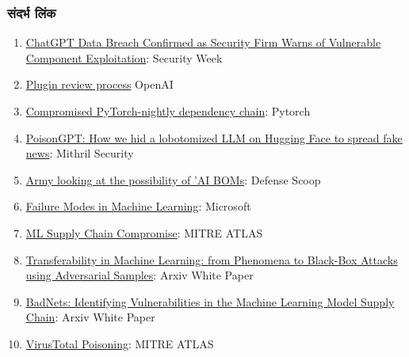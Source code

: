 \documentclass[
]{article}
\providecommand{\tightlist}{%
  \setlength{\itemsep}{0pt}\setlength{\parskip}{0pt}}
\begin{document}
\subsubsection{संदर्भ लिंक}\label{ux938ux926ux930ux92d-ux932ux915}

\begin{enumerate}
\def\labelenumi{\arabic{enumi}.}
\tightlist
\item
  \href{https://www.securityweek.com/chatgpt-data-breach-confirmed-as-security-firm-warns-of-vulnerable-component-exploitation/}{ChatGPT
  Data Breach Confirmed as Security Firm Warns of Vulnerable Component
  Exploitation}: Security Week
\item
  \href{https://platform.openai.com/docs/plugins/review}{Plugin review
  process} OpenAI
\item
  \href{https://pytorch.org/blog/compromised-nightly-dependency/}{Compromised
  PyTorch-nightly dependency chain}: Pytorch
\item
  \href{https://blog.mithrilsecurity.io/poisongpt-how-we-hid-a-lobotomized-llm-on-hugging-face-to-spread-fake-news/}{PoisonGPT:
  How we hid a lobotomized LLM on Hugging Face to spread fake news}:
  Mithril Security
\item
  \href{https://defensescoop.com/2023/05/25/army-looking-at-the-possibility-of-ai-boms-bill-of-materials/}{Army
  looking at the possibility of 'AI BOMs}: Defense Scoop
\item
  \href{https://learn.microsoft.com/en-us/security/engineering/failure-modes-in-machine-learning}{Failure
  Modes in Machine Learning}: Microsoft
\item
  \href{https://atlas.mitre.org/techniques/AML.T0010/}{ML Supply Chain
  Compromise}: MITRE ATLAS
\item
  \href{https://arxiv.org/pdf/1605.07277.pdf}{Transferability in Machine
  Learning: from Phenomena to Black-Box Attacks using Adversarial
  Samples}: Arxiv White Paper
\item
  \href{https://arxiv.org/abs/1708.06733}{BadNets: Identifying
  Vulnerabilities in the Machine Learning Model Supply Chain}: Arxiv
  White Paper
\item
  \href{https://atlas.mitre.org/studies/AML.CS0002}{VirusTotal
  Poisoning}: MITRE ATLAS
\end{enumerate}
\end{document}
